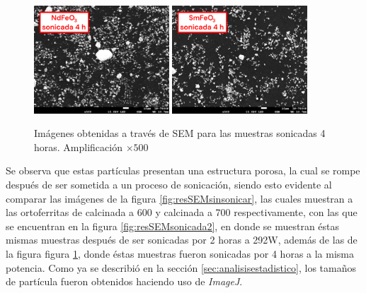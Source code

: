 \documentclass[../main.tex]{subfiles}
\begin{document}
\begin{figure}[H]
    \centering
    \includegraphics[width=0.45\textwidth]{fig/semneod4h.png}
    \quad
    \includegraphics[width=0.45\textwidth]{fig/semsama4h.png}
    \caption{Imágenes obtenidas a través de SEM para las muestras sonicadas 4 horas. Amplificación $\times500$}
    \label{fig:resSEMsonicada4}
\end{figure}
Se observa que estas partículas presentan una estructura porosa, la cual se rompe después de ser sometida a un proceso de sonicación, siendo esto evidente al comparar las imágenes de la figura \ref{fig:resSEMsinsonicar}, las cuales muestran a las ortoferritas de \neod{} calcinada a 600\gradoC{} y \sama{} calcinada a 700\gradoC{} respectivamente, con las que se encuentran en la figura \ref{fig:resSEMsonicada2}, en donde se muestran éstas mismas muestras después de ser sonicadas por 2 horas a 292W, además de las de la figura figura \ref{fig:resSEMsonicada4}, donde éstas muestras fueron sonicadas por 4 horas a la misma potencia.
Como ya se describió en la sección \ref{sec:analisisestadistico}, los tamaños de partícula fueron obtenidos haciendo uso de \textit{ImageJ}.
\end{document}
